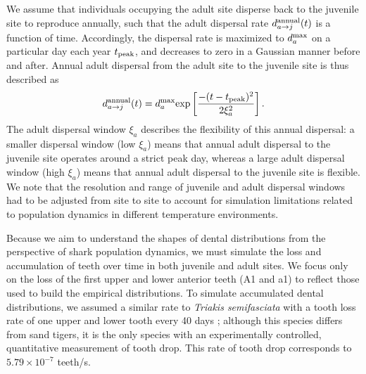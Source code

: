 \documentclass[]{rsos}%
\begin{document}
We assume that individuals occupying the adult site disperse back to the juvenile site to reproduce annually, such that the adult dispersal rate $d_{a\rightarrow j}^{\rm annual}(t)$ is a function of time.
Accordingly, the dispersal rate is maximized to $d_a^{\rm max}$ on a particular day each year $t_{\rm peak}$, and decreases to zero in a Gaussian manner before and after.
Annual adult dispersal from the adult site to the juvenile site is thus described as
\begin{equation}
    d_{a\rightarrow j}^{\rm annual}(t) = d_a^{\rm max}{\rm exp}\left[\frac{-(t - t_{\rm peak})^2}{2\xi_a^2}\right].
\end{equation}
The adult dispersal window $\xi_a$ describes the flexibility of this annual dispersal: a smaller dispersal window (low $\xi_a$) means that annual adult dispersal to the juvenile site operates around a strict peak day, whereas a large adult dispersal window (high $\xi_a$) means that annual adult dispersal to the juvenile site is flexible.
We note that the resolution and range of juvenile and adult dispersal windows had to be adjusted from site to site to account for simulation limitations related to population dynamics in different temperature environments.


Because we aim to understand the shapes of dental distributions from the perspective of shark population dynamics, we must simulate the loss and accumulation of teeth over time in both juvenile and adult sites.
We focus only on the loss of the first upper and lower anterior teeth (A1 and a1) to reflect those used to build the empirical distributions.
To simulate accumulated dental distributions, we assumed a similar rate to \emph{Triakis semifasciata} with a tooth loss rate of one upper and lower tooth every 40 days \cite{zeichner2017discrimination}; although this species differs from sand tigers, it is the only species with an experimentally controlled, quantitative measurement of tooth drop. This rate of tooth drop corresponds to $5.79\times 10^{-7}$ teeth/s.
\end{document}
